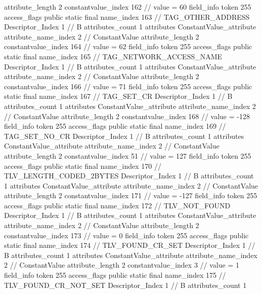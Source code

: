 {{{{{{{					attribute_length	2
					constantvalue_index	162		// value = 60
				}
				}
			}
			field_info {
				token	255
				access_flags	public static final
				name_index	163		// TAG_OTHER_ADDRESS
				Descriptor_Index	1		// B
				attributes_count	1
				attributes {
				ConstantValue_attribute {
					attribute_name_index	2		// ConstantValue
					attribute_length	2
					constantvalue_index	164		// value = 62
				}
				}
			}
			field_info {
				token	255
				access_flags	public static final
				name_index	165		// TAG_NETWORK_ACCESS_NAME
				Descriptor_Index	1		// B
				attributes_count	1
				attributes {
				ConstantValue_attribute {
					attribute_name_index	2		// ConstantValue
					attribute_length	2
					constantvalue_index	166		// value = 71
				}
				}
			}
			field_info {
				token	255
				access_flags	public static final
				name_index	167		// TAG_SET_CR
				Descriptor_Index	1		// B
				attributes_count	1
				attributes {
				ConstantValue_attribute {
					attribute_name_index	2		// ConstantValue
					attribute_length	2
					constantvalue_index	168		// value = -128
				}
				}
			}
			field_info {
				token	255
				access_flags	public static final
				name_index	169		// TAG_SET_NO_CR
				Descriptor_Index	1		// B
				attributes_count	1
				attributes {
				ConstantValue_attribute {
					attribute_name_index	2		// ConstantValue
					attribute_length	2
					constantvalue_index	51		// value = 127
				}
				}
			}
			field_info {
				token	255
				access_flags	public static final
				name_index	170		// TLV_LENGTH_CODED_2BYTES
				Descriptor_Index	1		// B
				attributes_count	1
				attributes {
				ConstantValue_attribute {
					attribute_name_index	2		// ConstantValue
					attribute_length	2
					constantvalue_index	171		// value = -127
				}
				}
			}
			field_info {
				token	255
				access_flags	public static final
				name_index	172		// TLV_NOT_FOUND
				Descriptor_Index	1		// B
				attributes_count	1
				attributes {
				ConstantValue_attribute {
					attribute_name_index	2		// ConstantValue
					attribute_length	2
					constantvalue_index	173		// value = 0
				}
				}
			}
			field_info {
				token	255
				access_flags	public static final
				name_index	174		// TLV_FOUND_CR_SET
				Descriptor_Index	1		// B
				attributes_count	1
				attributes {
				ConstantValue_attribute {
					attribute_name_index	2		// ConstantValue
					attribute_length	2
					constantvalue_index	3		// value = 1
				}
				}
			}
			field_info {
				token	255
				access_flags	public static final
				name_index	175		// TLV_FOUND_CR_NOT_SET
				Descriptor_Index	1		// B
				attributes_count	1
}}}}}
